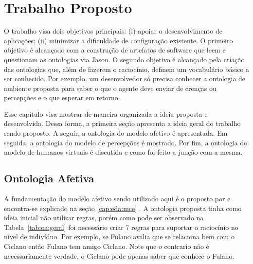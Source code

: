 \chapter{Trabalho Proposto} \label{cap:tp}


O trabalho visa dois objetivos principais: (i) apoiar o desenvolvimento de
aplicações; (ii) minimizar a dificuldade de configuração existente. O primeiro
objetivo é alcançado com a construção de artefatos de software que leem e
questionam as ontologias via Jason. O segundo objetivo é alcançado pela
criação das ontologias que, além de fazerem o raciocínio, definem um
vocabulário básico a ser conhecido. Por exemplo, um desenvolvedor só
precisa conhecer a ontologia de ambiente proposta para saber\dev{} o que o agente
deve enviar de crenças ou percepções e o que esperar em retorno.

Esse capítulo visa mostrar de maneira organizada a ideia proposta e
desenvolvida. Dessa forma, a primeira seção apresenta a ideia geral do
trabalho sendo proposto. A seguir, a ontologia do modelo afetivo é
apresentada. Em seguida, a ontologia do modelo de percepções é mostrado. Por
fim, a ontologia do modelo de humanos virtuais é discutida e como foi feito a
junção com a mesma.

\section{Ontologia Afetiva} \label{cap:tp:oa}

A fundamentação do modelo afetivo sendo utilizado aqui é o proposto por
\citet{ortony1988cse} e encontra-se explicado na seção \ref{cap:eda:mce}
. A ontologia proposta tinha
como ideia inicial não utilizar regras, porém como pode ser observado na
Tabela~\ref{tab:oa:geral} foi necessário criar 7 regras para suportar o
raciocínio no nível de indivíduo. Por exemplo, se Fulano avalia que se
relaciona bem com o Ciclano então Fulano tem amigo Ciclano. Note que
o contrario não é necessariamente verdade, o Ciclano pode apenas saber que
conhece o Fulano.

